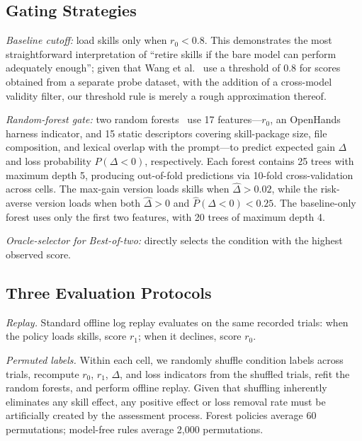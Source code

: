 \documentclass[10pt,conference]{IEEEtran}
\begin{document}
\subsection{Gating Strategies}
\emph{Baseline cutoff:} load skills only when $r_{0}<0.8$. This demonstrates the most straightforward interpretation of ``retire skills if the bare model can perform adequately enough''; given that Wang et al.~\cite{wang2026beyondgain} use a threshold of 0.8 for scores obtained from a separate probe dataset, with the addition of a cross-model validity filter, our threshold rule is merely a rough approximation thereof.

\emph{Random-forest gate:} two random forests~\cite{breiman2001rf} use 17 features---$r_{0}$, an OpenHands harness indicator, and 15 static descriptors covering skill-package size, file composition, and lexical overlap with the prompt---to predict expected gain $\Delta$ and loss probability $P(\Delta<0)$, respectively. Each forest contains 25 trees with maximum depth 5, producing out-of-fold predictions via 10-fold cross-validation across cells. The max-gain version loads skills when $\hat{\Delta}>0.02$, while the risk-averse version loads when both $\hat{\Delta}>0$ and $\hat{P}(\Delta<0)<0.25$. The baseline-only forest uses only the first two features, with 20 trees of maximum depth 4.

\emph{Oracle-selector for Best-of-two:} directly selects the condition with the highest observed score.

\subsection{Three Evaluation Protocols}
\emph{Replay.} Standard offline log replay evaluates on the same recorded trials: when the policy loads skills, score $r_{1}$; when it declines, score $r_{0}$.

\emph{Permuted labels.} Within each cell, we randomly shuffle condition labels across trials, recompute $r_{0}$, $r_{1}$, $\Delta$, and loss indicators from the shuffled trials, refit the random forests, and perform offline replay. Given that shuffling inherently eliminates any skill effect, any positive effect or loss removal rate must be artificially created by the assessment process. Forest policies average 60 permutations; model-free rules average 2,000 permutations.
\end{document}
